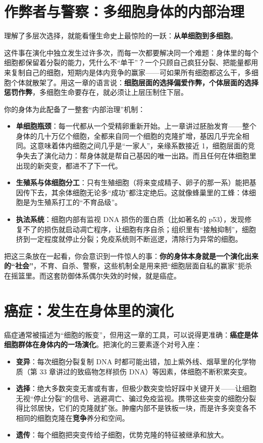 \section{作弊者与警察：多细胞身体的内部治理}

理解了多层次选择，就能看懂生命史上最惊险的一跃：\textbf{从单细胞到多细胞}。

这件事在演化中独立发生过许多次，而每一次都要解决同一个难题：身体里的每个细胞都保留着分裂的能力，凭什么不“单干”？一个只顾自己疯狂分裂、把能量都用来复制自己的细胞，短期内是体内竞争的赢家——可如果所有细胞都这么干，多细胞个体就散架了。用这一章的语言说：\textbf{细胞层面的选择偏爱作弊，个体层面的选择惩罚作弊}，多细胞生命要存在，就必须让上层压制住下层。

你的身体为此配备了一整套“内部治理”机制：

\begin{itemize}[itemsep=2pt]
\item \textbf{单细胞瓶颈}：每一代都从一个受精卵重新开始。上一章讲过胚胎发育——整个身体的几十万亿个细胞，全都来自同一个细胞的克隆扩增，基因几乎完全相同。这意味着体内细胞之间几乎是“一家人”，亲缘系数接近 1，细胞层面的竞争失去了演化动力：帮身体就是帮自己基因的唯一出路。而且任何在体细胞里出现的新突变，都进不了下一代。
\item \textbf{生殖系与体细胞分工}：只有生殖细胞（将来变成精子、卵子的那一系）能把基因传下去，其余体细胞无论多“成功”都注定绝后。这就像蜂巢里的工蜂：体细胞是为生殖系打工的“不育品级”。
\item \textbf{执法系统}：细胞内部有监视 DNA 损伤的蛋白质（比如著名的 p53），发现修复不了的损伤就启动凋亡程序，让细胞有序自杀；组织里有“接触抑制”，细胞挤到一定程度就停止分裂；免疫系统则不断巡逻，清除行为异常的细胞。
\end{itemize}

把这三条放在一起看，你会意识到一件惊人的事：\textbf{你的身体本身就是一个演化出来的“社会”}，不育、自杀、警察，这些机制全是用来把“细胞层面自私的赢家”扼杀在摇篮里。而这套防御体系偶尔失效的时候，就是癌症。

\section{癌症：发生在身体里的演化}

癌症通常被描述为“细胞的叛变”，但用这一章的工具，可以说得更准确：\textbf{癌症是体细胞群体在身体内的一场演化}。把演化的三要素逐个对号入座：

\begin{itemize}[itemsep=2pt]
\item \textbf{变异}：每次细胞分裂复制 DNA 时都可能出错，加上紫外线、烟草里的化学物质（第 33 章讲过的致癌物怎样损伤 DNA）等因素，体细胞不断积累突变。
\item \textbf{选择}：绝大多数突变无害或有害，但极少数突变恰好踩中关键开关——让细胞无视“停止分裂”的信号、逃避凋亡、骗过免疫监视。携带这些突变的细胞分裂得比邻居快，它们的克隆就扩张。肿瘤内部不是铁板一块，而是许多突变各不相同的细胞克隆在\textbf{竞争}养分和空间。
\item \textbf{遗传}：每个细胞把突变传给子细胞，优势克隆的特征被继承和放大。
\end{itemize}

